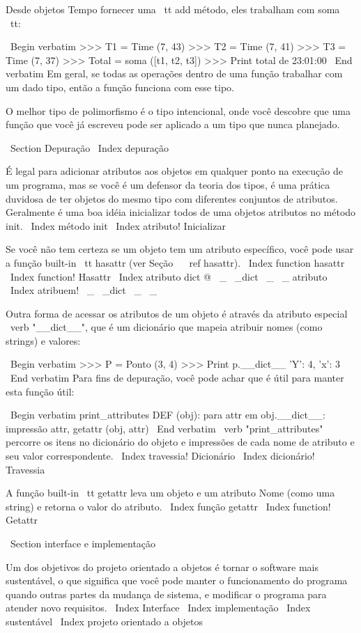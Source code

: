 \documentclass[10pt]{book}
\begin{document}
\begin {itemize}
{{{{{{{{{{{{{{Desde objetos Tempo fornecer uma {\ tt add} método, eles trabalham
com {soma \ tt}:

\ Begin {verbatim}
>>> T1 = Time (7, 43)
>>> T2 = Time (7, 41)
>>> T3 = Time (7, 37)
>>> Total = soma ([t1, t2, t3])
>>> Print total de
23:01:00
\ End {verbatim}
%
Em geral, se todas as operações dentro de uma função 
trabalhar com um dado tipo, então a função funciona com esse tipo.

O melhor tipo de polimorfismo é o tipo intencional, onde
você descobre que uma função que você já escreveu pode ser
aplicado a um tipo que nunca planejado.


\ Section {} Depuração
\ Index {depuração}

É legal para adicionar atributos aos objetos em qualquer ponto na execução
de um programa, mas se você é um defensor da teoria dos tipos, é uma
prática duvidosa de ter objetos do mesmo tipo com diferentes
conjuntos de atributos. Geralmente é uma boa idéia
inicializar todos de uma objetos atributos no método init.
\ Index {método init}
\ Index {atributo! Inicializar}

Se você não tem certeza se um objeto tem um atributo específico, você
pode usar a função built-in {\ tt hasattr} (ver Seção ~ \ ref {hasattr}).
\ Index {function hasattr}
\ Index {function! Hasattr}
\ Index {atributo dict @ \ _ \ _dict \ _ \ _ atributo}
\ Index {atribuem! \ _ \ _dict \ _ \ _}

Outra forma de acessar os atributos de um objeto é através da
atributo especial \ verb "__dict__", que é um dicionário que mapeia
atribuir nomes (como strings) e valores:

\ Begin {verbatim}
>>> P = Ponto (3, 4)
>>> Print p.__dict__
{'Y': 4, 'x': 3}
\ End {verbatim}
%
Para fins de depuração, você pode achar que é útil para manter esta
função útil:

\ Begin {verbatim}
print_attributes DEF (obj):
    para attr em obj.__dict__:
        impressão attr, getattr (obj, attr)
\ End {verbatim}
%
\ verb "print_attributes" percorre os itens no dicionário do objeto
e impressões de cada nome de atributo e seu valor correspondente.
\ Index {travessia! Dicionário}
\ Index {dicionário! Travessia}

A função built-in {\ tt getattr} leva um objeto e um atributo
Nome (como uma string) e retorna o valor do atributo.
\ Index {função getattr}
\ Index {function! Getattr}


\ Section {interface e implementação}

Um dos objetivos do projeto orientado a objetos é tornar o software mais
sustentável, o que significa que você pode manter o funcionamento do programa quando
outras partes da mudança de sistema, e modificar o programa para atender novo
requisitos.
\ Index {Interface}
\ Index {implementação}
\ Index {} sustentável
\ Index {projeto orientado a objetos}

}}}}}}}}}}}}}}
\end{itemize}
\end{document}
